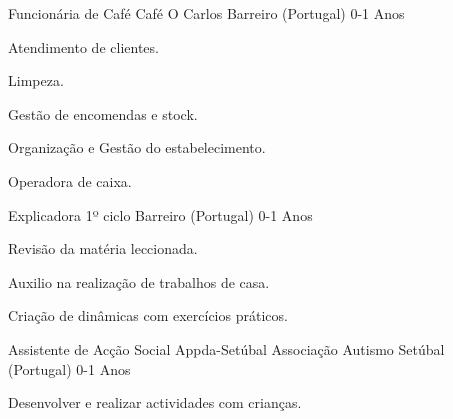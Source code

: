 


\begin{cventries}

  \cventry  
  	{Funcionária de Café} %
    {Café O Carlos} %
    {Barreiro (Portugal)} %
    {0-1 Anos} %
    {
      \begin{cvitems} %
		\item {Atendimento de clientes.}
  		\item {Limpeza.}
  		\item {Gestão de encomendas e stock.}
  		\item {Organização e Gestão do estabelecimento.}
  		\item {Operadora de caixa.}
      \end{cvitems}
    }  

  \cventry    
    {Explicadora 1º ciclo} %
    {} %
    {Barreiro (Portugal)} %
    {0-1 Anos} %
    {
      \begin{cvitems} %
		\item {Revisão da matéria leccionada.}
  		\item {Auxilio na realização de trabalhos de casa.}
  		\item {Criação de dinâmicas com exercícios práticos.}
      \end{cvitems}
    }    
    
  \cventry    
    {Assistente de Acção Social} %
    {Appda-Setúbal Associação Autismo} %
    {Setúbal (Portugal)} %
    {0-1 Anos} %
    {
      \begin{cvitems} %
		\item {Desenvolver e realizar actividades com crianças.}
      \end{cvitems}
    }
    \vspace{0.5cm}      


\end{cventries}
